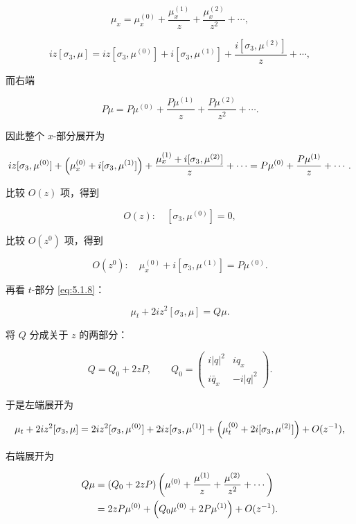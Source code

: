 \documentclass[
    lang=cn,
    scheme=chinese,
    mode=simple,
    device=normal,
    color=blue,
    math=cm,
    thmcnt=section,
    12pt
]{elegantbook}
\begin{document}
\[
    \mu_x
    =
    \mu_x^{(0)}
    +\dfrac{\mu_x^{(1)}}{z}
    +\dfrac{\mu_x^{(2)}}{z^2}
    +\cdots,
\]

\[
    iz[\sigma_3,\mu]
    =
    iz[\sigma_3,\mu^{(0)}]
    +i[\sigma_3,\mu^{(1)}]
    +\dfrac{i[\sigma_3,\mu^{(2)}]}{z}
    +\cdots,
\]

而右端

\[
    P\mu
    =
    P\mu^{(0)}
    +\dfrac{P\mu^{(1)}}{z}
    +\dfrac{P\mu^{(2)}}{z^2}
    +\cdots.
\]

因此整个 $x$-部分展开为

\[
    iz[\sigma_3,\mu^{(0)}]
    +\Bigl(\mu_x^{(0)}+i[\sigma_3,\mu^{(1)}]\Bigr)
    +\dfrac{\mu_x^{(1)}+i[\sigma_3,\mu^{(2)}]}{z}
    +\cdots
    =
    P\mu^{(0)}
    +\dfrac{P\mu^{(1)}}{z}
    +\cdots.
\]

比较 $O(z)$ 项，得到

\begin{equation}
    O(z):\quad[\sigma_3,\mu^{(0)}]=0,
    \tag{5.1.11}
    \label{eq:5.1.11}
\end{equation}

比较 $O(z^0)$ 项，得到

\begin{equation}
    O(z^0):\quad\mu_x^{(0)}+i[\sigma_3,\mu^{(1)}]=P\mu^{(0)}.
    \tag{5.1.12}
    \label{eq:5.1.12}
\end{equation}

再看 $t$-部分 \eqref{eq:5.1.8}：

\[
    \mu_t+2iz^2[\sigma_3,\mu]=Q\mu.
\]

将 $Q$ 分成关于 $z$ 的两部分：

\[
    Q=Q_0+2zP,
    \qquad
    Q_0=
    \begin{pmatrix}
        i\lvert q\rvert^2 & iq_x \\
        i\bar q_x          & -i\lvert q\rvert^2
    \end{pmatrix}.
\]

于是左端展开为

\[
    \mu_t+2iz^2[\sigma_3,\mu]
    =
    2iz^2[\sigma_3,\mu^{(0)}]
    +2iz[\sigma_3,\mu^{(1)}]
    +\Bigl(\mu_t^{(0)}+2i[\sigma_3,\mu^{(2)}]\Bigr)
    +O(z^{-1}),
\]

右端展开为

\[
    \begin{aligned}
        Q\mu
        &=(Q_0+2zP)
        \left(
            \mu^{(0)}+\dfrac{\mu^{(1)}}{z}+\dfrac{\mu^{(2)}}{z^2}+\cdots
        \right)\\
        &=2zP\mu^{(0)}
        +\Bigl(Q_0\mu^{(0)}+2P\mu^{(1)}\Bigr)
        +O(z^{-1}).
    \end{aligned}
\]
\end{document}
